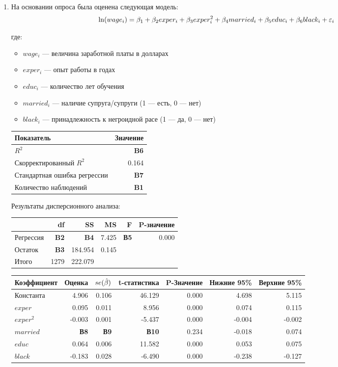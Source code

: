 \documentclass[12pt, a4paper]{article}\usepackage[]{graphicx}\usepackage[]{color}
\begin{document}
\begin{enumerate}

\item На основании опроса была оценена следующая модель:
\[
\ln(wage_i) = \beta_1 + \beta_2 exper_i + \beta_3 exper_i^2 + \beta_4 married_i + \beta_5 educ_i + \beta_6 black_i + \varepsilon_i
\]

где:
\begin{itemize}
\item $wage_i$ — величина заработной платы в долларах
\item $exper_i$ — опыт работы в годах
\item $educ_i$ — количество лет обучения
\item $married_i$ — наличие супруга/супруги (1 — есть, 0 — нет)
\item $black_i$ — принадлежность к негроидной расе (1 — да, 0 — нет)
\end{itemize}

\begin{tabular}{lr} \toprule
Показатель & Значение \\
\midrule
$R^2$                        & \textbf{B6} \\
Скорректированный $R^2$      & 0.164 \\
Стандартная ошибка регрессии & \textbf{B7} \\
Количество наблюдений        & \textbf{B1} \\
\bottomrule
\end{tabular}

Результаты дисперсионного анализа:

\begin{tabular}{lrrrrr} \toprule
 & df & SS & MS & F & P-значение \\
\midrule
Регрессия   & \textbf{B2}  & \textbf{B4}  & 7.425 & \textbf{В5} & 0.000 \\
Остаток     & \textbf{B3} & 184.954 & 0.145 &    &       \\
Итого       & 1279  & 222.079     &       &    &       \\
\bottomrule
\end{tabular}


\begin{tabular}{lrrrrrr} \toprule
Коэффициент & Оценка & $se(\hat{\beta})$ & t-статистика & P-Значение & Нижние 95\% & Верхние 95\% \\
\midrule
Константа & 4.906 & 0.106 & 46.129 & 0.000 & 4.698 & 5.115 \\
$exper$ & 0.095 & 0.011 & 8.956 & 0.000 & 0.074 & 0.115 \\
$exper^2$ & -0.003 & 0.001 & -5.437 & 0.000 & -0.004 & -0.002 \\
$married$ & \textbf{В8} & \textbf{В9} & \textbf{В10} & 0.234 & -0.018 & 0.074 \\
$educ$ & 0.064 & 0.006 & 11.582 & 0.000 & 0.053 & 0.075 \\
$black$ & -0.183 & 0.028 & -6.490 & 0.000 & -0.238 & -0.127 \\
\bottomrule
\end{tabular}


\end{enumerate}
\end{document}
